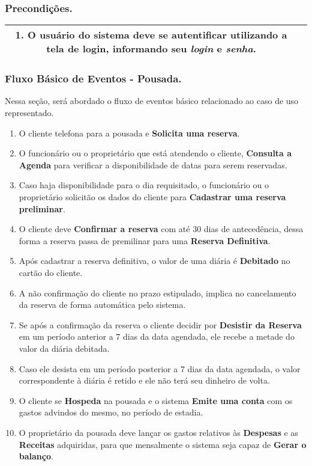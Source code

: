 \documentclass[a4paper,12pt]{article}
\begin{document}
\subsubsection{Precondições.}
\begin{tabular}{|c|c|}
\hline 
1. O usuário do sistema deve se autentificar utilizando a tela de login, informando seu \textit{\textbf{login}} e \textit{\textbf{senha}}.\\ 
\hline 
\end{tabular} 
\subsubsection{Fluxo Básico de Eventos - Pousada.}
Nessa seção, será abordado o fluxo de eventos básico relacionado ao caso de uso representado. 
\begin{enumerate}
\item O cliente telefona para a pousada e \textbf{Solicita uma reserva}.
\item O funcionário ou o proprietário que está atendendo o cliente, \textbf{Consulta a Agenda} para verificar a disponibilidade de datas para serem reservadas. 
\item Caso haja disponibilidade para o dia requisitado, o funcionário ou o proprietário solicitão os dados do cliente para \textbf{Cadastrar uma reserva preliminar}.
\item O cliente deve \textbf{Confirmar a reserva} com até 30 dias de antecedência, dessa forma a reserva passa de premilinar para uma \textbf{Reserva Definitiva}.
\item Após cadastrar a reserva definitiva, o valor de uma diária é \textbf{Debitado} no cartão do cliente. 
\item A não confirmação do cliente no prazo estipulado, implica no cancelamento da reserva de forma automática pelo sistema. 
\item Se após a confirmação da reserva o cliente decidir por \textbf{Desistir da Reserva} em um período anterior a 7 dias da data agendada, ele recebe a metade do valor da diária debitada. 
\item Caso ele desista em um período posterior a 7 dias da data agendada, o valor correspondente à diária é retido e ele não terá seu dinheiro de volta. 
\item O cliente se \textbf{Hospeda} na pousada e o sistema \textbf{Emite uma conta} com os gastos advindos do mesmo, no período de estadia. 
\item O proprietário da pousada deve lançar os gastos relativos às \textbf{Despesas} e as \textbf{Receitas} adquiridas, para que mensalmente o sistema seja capaz de \textbf{Gerar o balanço}. 
\end{enumerate}
\end{document}
